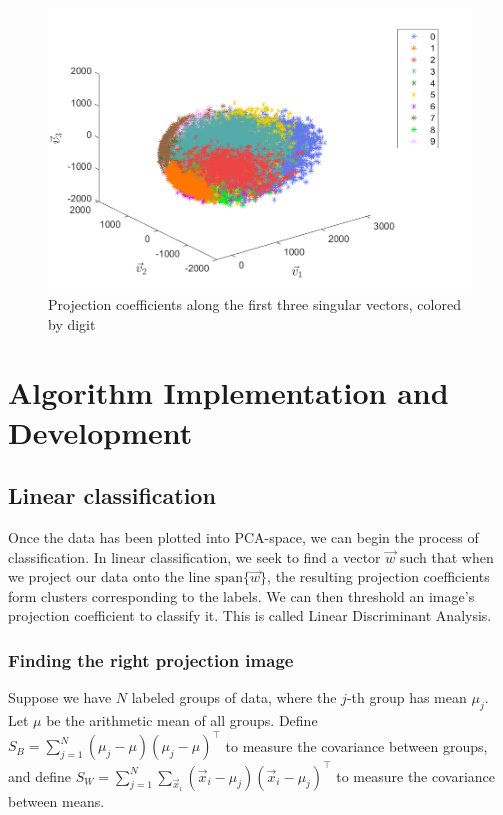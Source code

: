 \documentclass{article}
\begin{document}
\begin{figure}
	\centering
	\includegraphics[scale=0.9]{figs/10projections}
	\caption{Projection coefficients along the first three singular vectors, colored by digit}
	\label{fig:10projections}
\end{figure}



\section{Algorithm Implementation and Development}


\subsection{Linear classification}
Once the data has been plotted into PCA-space, we can begin the process of classification. In linear classification, we seek to find a vector $\vec{w}$ such that when we project our data onto the line $\text{span}\{\vec{w}\}$, the resulting projection coefficients form clusters corresponding to the labels. We can then threshold an image's projection coefficient to classify it. This is called Linear Discriminant Analysis.

\subsubsection{Finding the right projection image}

Suppose we have $N$ labeled groups of data, where the $j$-th group has mean $\mu_j$. Let $\mu$ be the arithmetic mean of all groups. Define $S_B = \sum_{j=1}^N (\mu_j - \mu)(\mu_j - \mu)^\top$ to measure the covariance between groups, and define $S_W = \sum_{j=1}^N \sum_{\vec{x}_i}(\vec{x}_i-\mu_j)(\vec{x}_i-\mu_j)^\top$ to measure the covariance between means.
\end{document}
